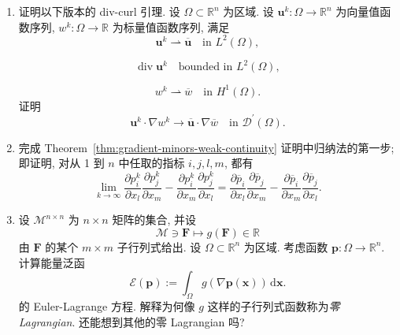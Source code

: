 \begin{enumerate}[label=\thesection.\arabic*.,ref=\thesection.\arabic*,start=9,series=book-problems]

\item\label{ex:div-curl-scalar-gradient-version} 证明以下版本的 div-curl 引理. 设 $\Omega\subset\mathbb{R}^n$ 为区域. 设 $\bm{u}^k:\Omega\to\mathbb{R}^n$ 为向量值函数序列, $w^k:\Omega\to\mathbb{R}$ 为标量值函数序列, 满足
\begin{equation}\label{eq:div-curl-exercise-vector-weak-ltwo-limit}
\bm{u}^k\rightharpoonup\overline{\bm{u}}\quad\text{in }L^2(\Omega),
\end{equation}

\begin{equation}\label{eq:div-curl-exercise-divergence-ltwo-bound}
\operatorname{div}\bm{u}^k\quad\text{bounded in }L^2(\Omega),
\end{equation}

\begin{equation}\label{eq:div-curl-exercise-scalar-weak-hone-limit}
w^k\rightharpoonup\overline w\quad\text{in }H^1(\Omega).
\end{equation}
证明
\begin{equation}\label{eq:div-curl-exercise-gradient-product-distributional-limit}
\bm{u}^k\cdot\nabla w^k\to\overline{\bm{u}}\cdot\nabla\overline w\quad\text{in }\mathcal{D}^{\prime}(\Omega).
\end{equation}


\item\label{ex:gradient-minors-induction-first-step} 完成 Theorem~\ref{thm:gradient-minors-weak-continuity} 证明中归纳法的第一步; 即证明, 对从 1 到 $n$ 中任取的指标 $i,j,l,m$, 都有\[\lim_{k\to\infty}\dfrac{\partial p_i^k}{\partial x_l}\dfrac{\partial p_j^k}{\partial x_m}-\dfrac{\partial p_i^k}{\partial x_m}\dfrac{\partial p_j^k}{\partial x_l}=\dfrac{\partial\overline p_i}{\partial x_l}\dfrac{\partial\overline p_j}{\partial x_m}-\dfrac{\partial\overline p_i}{\partial x_m}\dfrac{\partial\overline p_j}{\partial x_l}.\]

\item\label{ex:subdeterminants-null-lagrangians} 设 $\mathcal{M}^{n\times n}$ 为 $n\times n$ 矩阵的集合, 并设\[\mathcal{M}\ni\bm{F}\mapsto g(\bm{F})\in\mathbb{R}\]由 $\bm{F}$ 的某个 $m\times m$ 子行列式给出. 设 $\Omega\subset\mathbb{R}^n$ 为区域. 考虑函数 $\bm{p}:\Omega\to\mathbb{R}^n$. 计算能量泛函
\begin{equation}\label{eq:subdeterminant-null-lagrangian-energy}
\mathcal{E}(\bm{p}):=\int_\Omega g(\nabla\bm{p}(\bm{x}))\,\mathrm{d}\bm{x}.
\end{equation}
的 Euler-Lagrange 方程. 解释为何像 $g$ 这样的子行列式函数称为\emph{零 Lagrangian}. 还能想到其他的零 Lagrangian 吗?


\end{enumerate}

